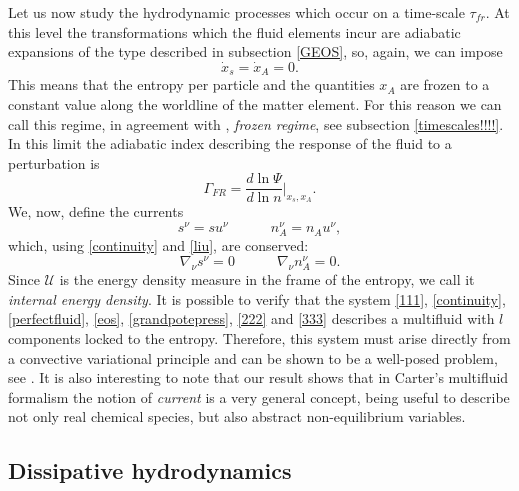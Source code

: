 \documentclass[useAMS,usenatbib,prd,twocolumn,nofootinbib]{revtex4-1}
\newcommand{\spc}{\quad \quad \quad}
\begin{document}
Let us now study the hydrodynamic processes which occur on a time-scale $\tau_{fr}$. At this level the transformations which the fluid elements incur are adiabatic expansions of the type described in subsection \ref{GEOS}, so, again, we can impose
\begin{equation}\label{liu}
\dot{x}_s = \dot{x}_A =0.
\end{equation}
This means that the entropy per particle and the quantities $x_A$ are frozen to a constant value along the worldline of the matter element. For this reason we can call this regime, in agreement with \citet{haensel_frozen},  \textit{frozen regime}, see subsection \ref{timescales!!!!}. In this limit the adiabatic index describing the response of the fluid to a perturbation is
\begin{equation}
\Gamma_{FR} = \dfrac{d \ln \Psi}{d \ln n} \bigg|_{x_s, x_A} .
\end{equation}
We, now, define the currents
\begin{equation}\label{222}
s^\nu = s u^\nu  \spc  n_A^\nu = n_A u^\nu,
\end{equation} 
which, using \eqref{continuity} and \eqref{liu}, are conserved:
\begin{equation}\label{333}
\nabla_\nu s^\nu =0  \spc  \nabla_\nu n_A^\nu =0.
\end{equation}
Since $\mathcal{U}$ is the energy density measure in the frame of the entropy, we call it \textit{internal energy density}. It is possible to verify that the system \eqref{111}, \eqref{continuity}, \eqref{perfectfluid}, \eqref{eos}, \eqref{grandpotepress}, \eqref{222} and \eqref{333} describes a multifluid with $l$ components locked to the entropy. Therefore, this system must arise directly from a convective variational principle and can be shown to be a well-posed problem, see \cite{andersson2007review}. 
It is also interesting to note that our result shows that in Carter's multifluid formalism the notion of \textit{current} is a very general concept, being useful to describe not only real chemical species, but also abstract non-equilibrium variables. 



\subsection{Dissipative hydrodynamics}
\end{document}
